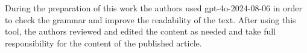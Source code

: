 During the preparation of this work the authors used gpt-4o-2024-08-06 in order to check the grammar and improve the readability of the text. After using this tool, the authors reviewed and edited the content as needed and take full responsibility for the content of the published article.